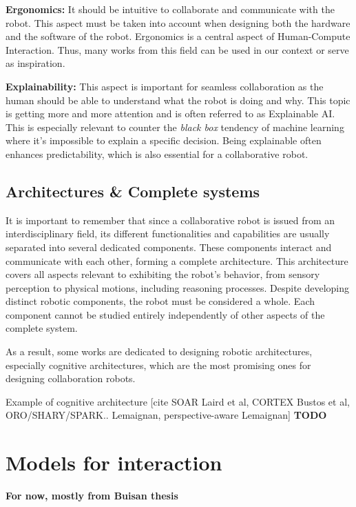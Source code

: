 \textbf{Ergonomics:} It should be intuitive to collaborate and communicate with the robot. This aspect must be taken into account when designing both the hardware and the software of the robot. Ergonomics is a central aspect of Human-Compute Interaction. Thus, many works from this field can be used in our context or serve as inspiration.

\textbf{Explainability:} This aspect is important for seamless collaboration as the human should be able to understand what the robot is doing and why. This topic is getting more and more attention and is often referred to as Explainable AI. This is especially relevant to counter the \textit{black box} tendency of machine learning where it's impossible to explain a specific decision. Being explainable often enhances predictability, which is also essential for a collaborative robot.

\subsection{Architectures \& Complete systems}

It is important to remember that since a collaborative robot is issued from an interdisciplinary field, its different functionalities and capabilities are usually separated into several dedicated components. These components interact and communicate with each other, forming a complete architecture. This architecture covers all aspects relevant to exhibiting the robot's behavior, from sensory perception to physical motions, including reasoning processes. 
Despite developing distinct robotic components, the robot must be considered a whole. Each component cannot be studied entirely independently of other aspects of the complete system.  

As a result, some works are dedicated to designing robotic architectures, especially cognitive architectures, which are the most promising ones for designing collaboration robots. 

Example of cognitive architecture
[cite SOAR Laird et al, CORTEX Bustos et al, ORO/SHARY/SPARK.. Lemaignan, perspective-aware Lemaignan]
\textbf{TODO}

\section{Models for interaction}

\textbf{For now, mostly from Buisan thesis}

